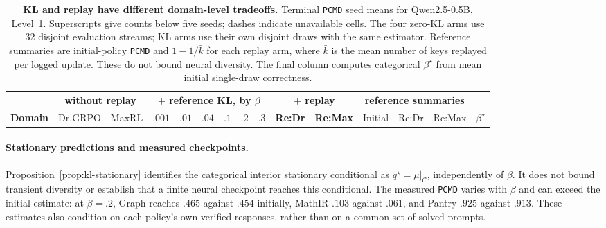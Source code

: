 \documentclass{article}
\newcommand{\1}{\mathbf 1}
\newcommand{\pmd}{\texttt{PCMD}}
\theoremstyle{remark}
\theoremstyle{definition}
\theoremstyle{plain}
\begin{document}
\begin{table}[t]
  \centering
  \caption{\textbf{KL and replay have different domain-level tradeoffs.}
  Terminal \pmd{} seed means for Qwen2.5-0.5B, Level~1. Superscripts give
  counts below five seeds; dashes indicate unavailable cells. The four
  zero-KL arms use 32 disjoint evaluation streams; KL arms use their own
  disjoint draws with the same estimator. Reference summaries are
  initial-policy \pmd{} and $1-1/\bar k$ for each replay arm, where $\bar k$
  is the mean number of keys replayed per logged update. These do not bound
  neural diversity. The final column computes categorical $\beta^\star$
  from mean initial single-draw correctness.}
  \label{tab:reference-kl-measured}
  \scriptsize
  \setlength{\tabcolsep}{2.5pt}
  \begin{tabular}{@{}lrrrrrrrrrrrrrr@{}}
    \toprule
    & \multicolumn{2}{c}{\textbf{without replay}}
      & \multicolumn{6}{c}{\textbf{$+$ reference KL, by $\beta$}}
      & \multicolumn{2}{c}{\textbf{$+$ replay}}
      & \multicolumn{3}{c}{\textbf{reference summaries}} & \\
    \cmidrule(lr){2-3}\cmidrule(lr){4-9}\cmidrule(lr){10-11}\cmidrule(lr){12-14}
    \textbf{Domain} & Dr.GRPO & MaxRL
      & $.001$ & $.01$ & $.04$ & $.1$ & $.2$ & $.3$
      & \textbf{Re:Dr} & \textbf{Re:Max}
      & Initial & Re:Dr & Re:Max & $\beta^\star$ \\
    \midrule
    
  \end{tabular}
\end{table}

\paragraph{Stationary predictions and measured checkpoints.}
Proposition~\ref{prop:kl-stationary} identifies the categorical interior
stationary conditional as $q^\star=\mu|_{\mathcal C}$, independently of
$\beta$. It does not bound transient diversity or establish that a finite
neural checkpoint reaches this conditional. The measured \pmd{} varies
with $\beta$ and can exceed the initial estimate: at $\beta=.2$, Graph
reaches $.465$ against $.454$ initially, MathIR $.103$ against $.061$,
and Pantry $.925$ against $.913$. These estimates also condition on each
policy's own verified responses, rather than on a common set of solved
prompts.
\end{document}
